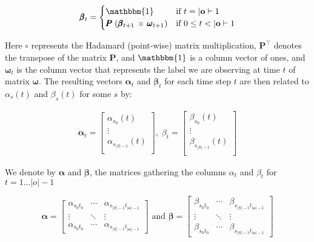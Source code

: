 \begin{equation}
    \label{eq:beta}
    \pmb{\beta}_t =
    \begin{cases}
        \mathbbm{1} & \text{if } t = |\mathbf{o}|-1        \\
        \pmb{P} \; (\pmb{\beta}_{t + 1} \; \circ \; \pmb{\omega}_{t + 1}) & \text{if } 0 \leq t < |\mathbf{o}|-1 \\
    \end{cases}
\end{equation}

Here $\circ$ represents the Hadamard (point-wise) matrix multiplication, $\pmb{P}^\top$ denotes the transpose of the matrix $\pmb{P}$, and $\mathbbm{1}$ is a column vector of ones, and $\pmb{\omega}_t$ is the column vector that represents the label we are observing at time $t$ of matrix $\pmb{\omega}$.
The resulting vectors $\pmb{\alpha}_t$ and $\pmb{\beta}_t$ for each time step $t$ are then related to $\alpha_s(t)$ and $\beta_s(t)$ for some $s$ by:

\begin{align}
\pmb{\alpha}
    _t = \begin{bmatrix}
             \alpha_{s_0}(t)       \\
             \vdots                \\
             \alpha_{s_{|S|-1}}(t) \\
    \end{bmatrix}, \;
    {\beta}_t = \begin{bmatrix}
                    \beta_{s_0}(t)       \\
                    \vdots               \\
                    \beta_{s_{|S|-1}}(t) \\
    \end{bmatrix}
\end{align}

We denote by $\pmb{\alpha}$ and $\pmb{\beta}$, the matrices gathering the 
columns $\alpha_t$ and $\beta_t$ for $t = 1\dots |o|-1$

\begin{equation}
    \pmb{\alpha} = 
        \begin{bmatrix}
            \alpha_{s_0 t_{0}}  & \cdots & \alpha_{s_{|S|-1}t_{|\textbf{o}|-1}} \\
            \vdots               & \ddots & \vdots                      \\
            \alpha_{s_0 t_{0}}  & \cdots & \alpha_{s_{|S|-1}t_{|\textbf{o}|-1}}
        \end{bmatrix}
        \text{ and }
    \pmb{\beta} = 
        \begin{bmatrix}
            \beta_{s_0 t_{0}}  & \cdots & \beta_{s_{|S|-1}t_{|\textbf{o}|-1}} \\
            \vdots               & \ddots & \vdots                      \\
            \beta_{s_0 t_{0}}  & \cdots & \beta_{s_{|S|-1}t_{|\textbf{o}|-1}}
        \end{bmatrix}\label{eq:forward-backward-matrix}
\end{equation}

